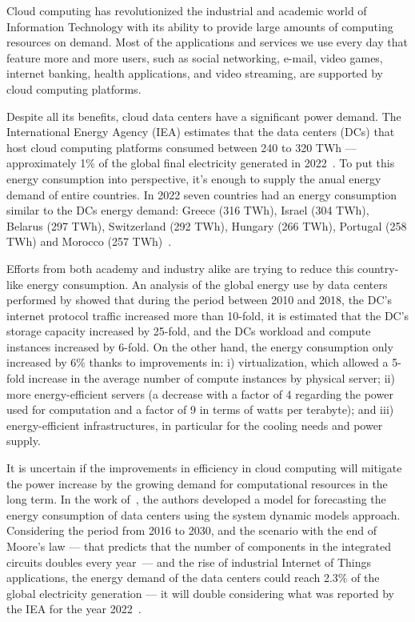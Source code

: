 Cloud computing has revolutionized the industrial and academic world of Information Technology with its ability to provide large amounts of computing resources on demand. Most of the applications and services we use every day that feature more and more users, such as social networking, e-mail, video games, internet banking, health applications, and video streaming, are supported by cloud computing platforms.

Despite all its benefits, cloud data centers have a significant power demand. The International Energy Agency (IEA) estimates that the data centers (DCs) that host cloud computing platforms consumed between 240 to 320 TWh ---   approximately 1\% of the global final electricity generated in 2022~\cite{IEA_2022}. To put this energy consumption into perspective, it's enough to supply the anual energy demand of entire countries. In 2022 seven countries had an energy consumption similar to the DCs energy demand: Greece (316 TWh), Israel (304 TWh), Belarus (297 TWh), Switzerland (292 TWh), Hungary (266 TWh), Portugal (258 TWh) and Morocco (257 TWh)~\cite{owidenergy}.


Efforts from both academy and industry alike are trying to reduce this country-like energy consumption. An analysis of the global energy use by data centers performed by \citet{masanet2020recalibrating} showed that during the period between 2010 and 2018, the DC's internet protocol traffic increased more than 10-fold, it is estimated that the DC's storage capacity increased by 25-fold, and the DCs workload and compute instances increased by 6-fold. On the other hand, the energy consumption only increased by 6\% thanks to improvements in: i) virtualization, which allowed a 5-fold increase in the average number of compute instances by physical server; ii) more energy-efficient servers (a decrease with a factor of 4 regarding the power used for computation and a factor of 9 in terms of watts per terabyte); and iii) energy-efficient infrastructures, in particular for the cooling needs and power supply.

It is uncertain if the improvements in efficiency in cloud computing will mitigate the power increase by the growing demand for computational resources in the long term. In the work of~\citet{koot2021usage}, the authors developed a model for forecasting the energy consumption of data centers using the system dynamic models approach. Considering the period from 2016 to 2030, and the scenario with the end of Moore's law --- that predicts that the number of components in the integrated circuits doubles every year~\cite{Mack_2011_moorelaw}---  and the rise of industrial Internet of Things applications, the energy demand of the data centers could reach 2.3\% of the global electricity generation --- it will double considering what was reported by the IEA for the year 2022~\cite{IEA_2022}.

